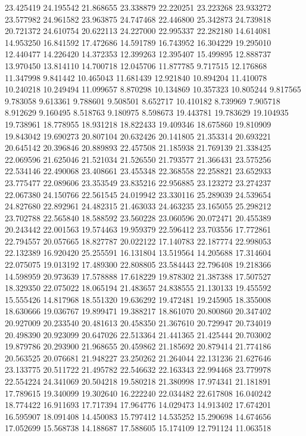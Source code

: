 23.425419
24.195542
21.868655
23.338879
22.220251
23.223268
23.933272
23.577982
24.961582
23.963875
24.747468
22.446800
25.342873
24.739818
20.721372
24.610754
20.622113
24.227000
22.995337
22.282180
14.614081
14.953250
16.841592
17.472686
14.591789
16.743952
16.304229
19.295010
12.440477
14.226420
14.372353
12.399263
12.395407
15.499895
12.888737
13.970450
13.814110
14.700718
12.045706
11.877785
9.717515
12.176868
11.347998
9.841442
10.465043
11.681439
12.921840
10.894204
11.410078
10.240218
10.249494
11.099657
8.870298
10.134869
10.357323
10.805244
9.817565
9.783058
9.613361
9.788601
9.508501
8.652717
10.410182
8.739969
7.905718
8.912629
9.160495
8.518763
9.180975
8.598673
19.443781
19.783629
19.104935
19.738961
18.778955
18.931218
18.822433
19.409346
18.675860
19.810909
19.843042
19.690273
20.807104
20.632426
20.141805
21.353314
20.693221
20.645142
20.396846
20.889893
22.457508
21.185938
21.769139
21.338425
22.069596
21.625046
21.521034
21.526550
21.793577
21.366431
23.575256
22.534146
22.490068
23.408661
23.455348
22.368558
22.258821
23.652933
23.775477
22.089606
23.353549
23.835216
22.956885
23.123272
23.274237
22.067380
24.150766
22.561545
24.019942
23.330116
25.289039
24.539654
24.827680
22.892961
24.482315
21.463033
24.463235
23.165055
25.298212
23.702788
22.565840
18.588592
23.560228
23.060596
20.072471
20.455389
20.243442
22.001563
19.574463
19.959379
22.596412
23.703556
17.772861
22.794557
20.057665
18.827787
20.022122
17.140783
22.187774
22.998053
22.132389
16.920420
25.255591
16.131804
13.519564
14.205688
17.314604
22.075075
19.013192
17.489300
22.808805
23.584443
22.796408
19.218366
14.598959
20.973639
17.578888
17.618229
19.878302
21.387388
17.507527
18.329350
22.075022
18.065194
21.483657
24.838555
21.130133
19.455592
15.555426
14.817968
18.551320
19.636292
19.472481
19.245905
18.355008
18.630666
19.036767
19.899471
19.388217
18.861070
20.800860
20.347402
20.927009
20.233540
20.481613
20.458350
21.367610
20.729947
20.734019
20.498390
20.923099
20.647026
22.513364
21.441365
21.425444
20.703002
19.879786
20.293900
21.968655
20.459862
21.185692
20.879414
21.774186
20.563525
20.076681
21.948227
23.250262
21.264044
22.131236
21.627646
23.133775
20.511722
21.495782
22.546632
22.163343
22.994468
23.779978
22.554224
24.341069
20.504218
19.580218
21.380998
17.974341
21.181891
17.789615
19.340099
19.302640
16.222240
22.034482
22.617808
16.040242
18.774422
16.911693
17.717394
17.964776
14.029473
14.913402
17.674201
16.595907
18.091408
14.450083
15.797412
14.535252
15.290698
14.674656
17.052699
15.568738
14.188687
17.588605
15.174109
12.791124
11.063518
